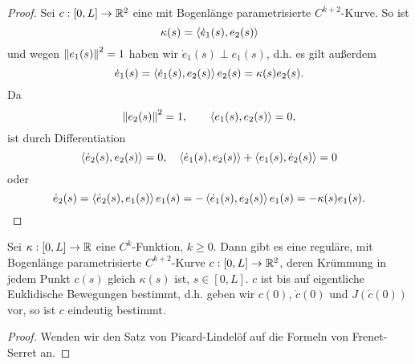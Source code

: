 \documentclass[
pdftex,
oneside,
headsepline,
11pt, 
]{scrreprt}
\begin{document}
\begin{proof}
Sei $c:[0,L]\to \mathbb{R}^2$ eine mit Bogenlänge parametrisierte $C^{k+2}$-Kurve. So ist \[ \kappa(s)=\left\langle \dot{e}_1(s),e_2(s) \right\rangle \] und wegen $\left\lVert e_1(s)\right\rVert^2=1$ haben wir $\dot{e}_1(s)\perp e_1(s)$, d.h. es gilt außerdem \[  \dot{e}_1(s)=\left\langle \dot{e}_1(s),e_2(s) \right\rangle e_2(s)=\kappa(s)e_2(s). \]
Da \[  \left\lVert e_2(s)\right\rVert^2=1,\qquad \left\langle e_1(s),e_2(s) \right\rangle=0, \]
ist durch Differentiation \[ \left\langle \dot{e}_2(s),e_2(s) \right\rangle=0,\quad \left\langle \dot{e}_1(s),e_2(s) \right\rangle+\left\langle e_1(s),\dot{e}_2(s) \right\rangle=0  \] oder 
\[   \dot{e}_2(s)=\left\langle \dot{e}_2(s),e_1(s) \right\rangle e_1(s)=-\left\langle \dot{e}_1(s),e_2(s) \right\rangle e_1(s)=-\kappa(s)e_1(s). \]
\end{proof}
\begin{theo}
Sei $\kappa:[0,L]\to\mathbb{R}$ eine $C^k$-Funktion, $k\geq 0$. Dann gibt es eine reguläre, mit Bogenlänge parametrisierte $C^{k+2}$-Kurve $c:[0,L]\to \mathbb{R}^2$, deren Krümmung in jedem Punkt $c(s)$ gleich $\kappa(s)$ ist, $s\in [0,L]$. $c$ ist bis auf eigentliche Euklidische Bewegungen bestimmt, d.h. geben wir $c(0)$, $\dot{c}(0)$ und $J(\dot{c}(0))$ vor, so ist $c$ eindeutig bestimmt.
\end{theo}
\begin{proof}
Wenden wir den Satz von Picard-Lindelöf auf die Formeln von Frenet-Serret an.
\end{proof}
\end{document}

